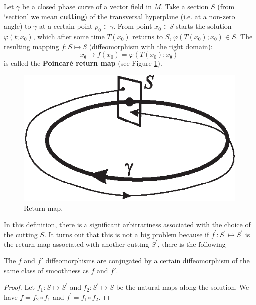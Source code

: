 \begin{definition}
	Let $ \gamma $ be a closed phase curve of a vector field in $ M $. Take a section $ S $ (from `section' we mean \textbf{cutting}) of the transversal hyperplane (i.e. at a non-zero angle) to $ \gamma $ at a certain point $ p_ {0} \in \gamma $. From point $x_{0}\in S$ starts the solution $\varphi
	(t;x_{0})$, which after some time $ T (x_ {0}) $ returns to $ S $, $\varphi (T(x_{0});x_{0})\in S$. The resulting mapping $f:S\longmapsto S$ (diffeomorphism with the right domain): $$
	x_{0}\longmapsto f(x_{0})=\varphi (T(x_{0});x_{0})
	$$
	 is called the \textbf{Poincaré return map} (see Figure \ref{fig:2.3}).
\end{definition}

\begin{figure}[!ht]
	\centering
	\includegraphics [scale=1]{jtr23}
	\caption{Return map.}
	\label{fig:2.3}
\end{figure}

In this definition, there is a significant arbitrariness associated with the choice of the cutting $ S $. It turns out that this is not a big problem because if $f^{\prime }:S^{\prime }\longmapsto S^{\prime }$ is the return map associated with another cutting $ S ^ {\prime} $, there is the following

\begin{lemma}
	The $f$ and $f'$ diffeomorphisms are conjugated by a certain diffeomorphism of the same class of smoothness as $f$ and $f'$.
	\begin{proof}
		Let $ f_ {1}: S \longmapsto S ^ {\prime} $ and $ f_ {2}: S ^ {\prime} \longmapsto S $ be the natural maps along the solution. We have $f=f_{2}\circ f_{1}$ and $f^{\prime }=f_{1}\circ f_{2}$.
	\end{proof}
\end{lemma}

